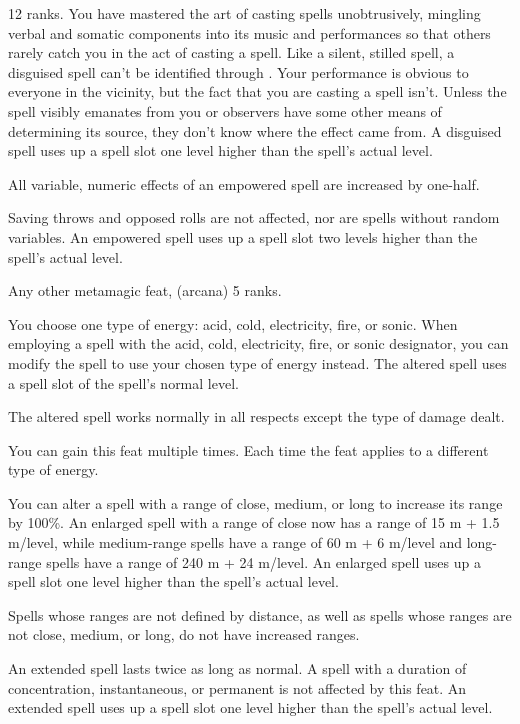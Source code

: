 
{ 12 ranks.}
{You have mastered the art of casting spells unobtrusively, mingling verbal and somatic components into its music and performances so that others rarely catch you in the act of casting a spell. Like a silent, stilled spell, a disguised spell can't be identified through . Your performance is obvious to everyone in the vicinity, but the fact that you are casting a spell isn't. Unless the spell visibly emanates from you or observers have some other means of determining its source, they don't know where the effect came from. A disguised spell uses up a spell slot one level higher than the spell's actual level.}

{All variable, numeric effects of an empowered spell are increased by one-half.

Saving throws and opposed rolls are not affected, nor are spells without random variables. An empowered spell uses up a spell slot two levels higher than the spell's actual level.}

{}
{Any other metamagic feat,  (arcana) 5 ranks.}
{You choose one type of energy: acid, cold, electricity, fire, or sonic. When employing a spell with the acid, cold, electricity, fire, or sonic designator, you can modify the spell to use your chosen type of energy instead. The altered spell uses a spell slot of the spell’s normal level.

The altered spell works normally in all respects except the type of damage dealt.}
{}{You can gain this feat multiple times. Each time the feat applies to a different type of energy.}

{You can alter a spell with a range of close, medium, or long to increase its range by 100\%. An enlarged spell with a range of close now has a range of 15 m + 1.5 m/level, while medium-range spells have a range of 60 m + 6 m/level and long-range spells have a range of 240 m + 24 m/level. An enlarged spell uses up a spell slot one level higher than the spell's actual level.

Spells whose ranges are not defined by distance, as well as spells whose ranges are not close, medium, or long, do not have increased ranges.}

{An extended spell lasts twice as long as normal. A spell with a duration of concentration, instantaneous, or permanent is not affected by this feat. An extended spell uses up a spell slot one level higher than the spell's actual level.}

